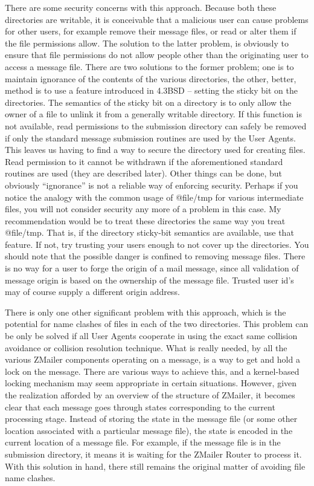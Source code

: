 There are some security concerns with this approach.
Because both these directories are writable, it is conceivable
that a malicious user can cause problems for other users,
for example remove their message files, or read or alter
them if the file permissions allow.
The solution to the latter problem, is obviously to ensure that
file permissions do not allow people other than the originating
user to access a message file.
There are two solutions to the former problem; one is to maintain
ignorance of the contents of the various directories, the other,
better, method is to use a feature introduced in 4.3BSD -- setting
the sticky bit on the directories.
The semantics of the sticky bit on a directory is to only allow
the owner of a file to unlink it from a generally writable directory.
If this function is not available, read permissions to the submission
directory can safely be removed if only the standard message submission
routines are used by the User Agents.
This leaves us having to find a way to secure the directory used for
creating files.
Read permission to it cannot be withdrawn if the aforementioned
standard routines are used (they are described later).
Other things can be done, but obviously ``ignorance'' is not
a reliable way of enforcing security.
Perhaps if you notice the analogy with the common usage of @file{/tmp}
for various intermediate files, you will not consider security any more
of a problem in this case.
My recommendation would be to treat these directories the same way you
treat @file{/tmp}.
That is, if the directory sticky-bit semantics are available, use
that feature.
If not, try trusting your users enough to not cover up the directories.
You should note that the possible danger is confined to removing
message files.
There is no way for a user to forge the origin of a mail message,
since all validation of message origin is based on the ownership
of the message file.
Trusted user id's may of course supply a different origin address.

There is only one other significant problem with this approach, which
is the potential for name clashes of files in each of the two directories.
This problem can be only be solved if all User Agents cooperate in using
the exact same collision avoidance or collision resolution technique.
What is really needed, by all the various ZMailer components operating
on a message, is a way to get and hold a lock on the message.
There are various ways to achieve this, and a kernel-based locking
mechanism may seem appropriate in certain situations.
However, given the realization afforded by an overview of the structure
of ZMailer, it becomes clear that each message goes through states
corresponding to the current processing stage.
Instead of storing the state in the message file (or some other
location associated with a particular message file), the state is
encoded in the current location of a message file.
For example, if the message file is in the submission directory,
it means it is waiting for the ZMailer Router to process it.
With this solution in hand, there still remains the original
matter of avoiding file name clashes.

